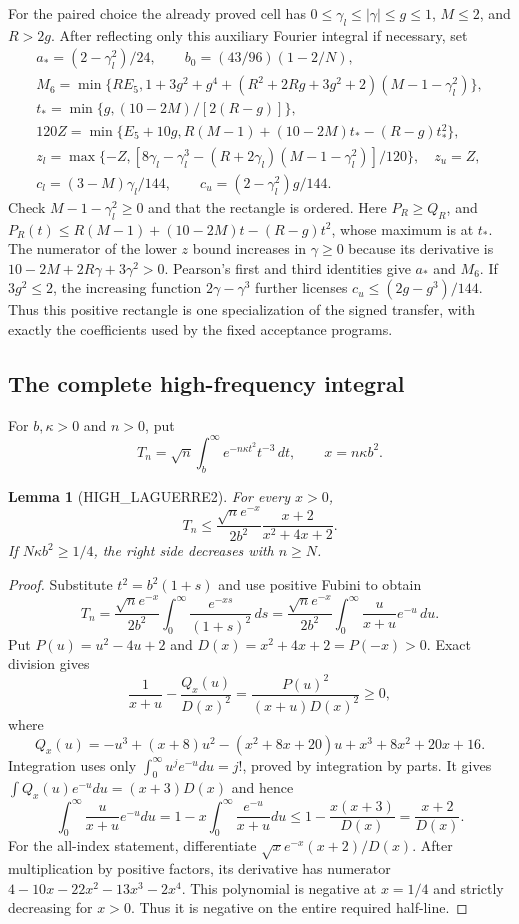 \documentclass[11pt,a4paper]{article}
\numberwithin{equation}{section}
\newtheorem{lemma}[theorem]{Lemma}
\theoremstyle{definition}
\theoremstyle{remark}
\begin{document}
For the paired choice the already proved cell has
$0\le\gamma_l\le|\gamma|\le g\le1$, $M\le2$, and $R>2g$. After reflecting only this auxiliary Fourier integral if necessary, set
\begin{gather*}
 a_*=(2-\gamma_l^2)/24,\qquad b_0=(43/96)(1-2/N),\\
 M_6=\min\{RE_5,1+3g^2+g^4+(R^2+2Rg+3g^2+2)(M-1-\gamma_l^2)\},\\
 t_*=\min\{g,(10-2M)/[2(R-g)]\},\\
 120Z=\min\{E_5+10g,R(M-1)+(10-2M)t_*-(R-g)t_*^2\},\\
 z_l=\max\{-Z,[8\gamma_l-\gamma_l^3-(R+2\gamma_l)(M-1-\gamma_l^2)]/120\},
 \quad z_u=Z,\\
 c_l=(3-M)\gamma_l/144,\qquad c_u=(2-\gamma_l^2)g/144.
\end{gather*}
Check $M-1-\gamma_l^2\ge0$ and that the rectangle is ordered. Here
$P_R\ge Q_R$, and $P_R(t)\le R(M-1)+(10-2M)t-(R-g)t^2$,
whose maximum is at $t_*$. The numerator of the lower $z$ bound increases
in $\gamma\ge0$ because its derivative is
$10-2M+2R\gamma+3\gamma^2>0$. Pearson's first and third identities
give $a_*$ and $M_6$. If $3g^2\le2$, the increasing function
$2\gamma-\gamma^3$ further licenses $c_u\le(2g-g^3)/144$.
Thus this positive rectangle is one specialization of the signed transfer,
with exactly the coefficients used by the fixed acceptance programs.

\subsection{The complete high-frequency integral}
For $b,\kappa>0$ and $n>0$, put
\[
 T_n=\sqrt n\int_b^\infty e^{-n\kappa t^2}t^{-3}\,dt,
 \qquad x=n\kappa b^2.
\]
\begin{lemma}[HIGH\_LAGUERRE2]
For every $x>0$,
\[
 T_n\le\frac{\sqrt n e^{-x}}{2b^2}
                  \frac{x+2}{x^2+4x+2}.
\]
If $N\kappa b^2\ge1/4$, the right side decreases with $n\ge N$.
\end{lemma}
\begin{proof}
Substitute $t^2=b^2(1+s)$ and use positive Fubini to obtain
\[
 T_n=\frac{\sqrt n e^{-x}}{2b^2}
 \int_0^\infty\frac{e^{-xs}}{(1+s)^2}\,ds
 =\frac{\sqrt n e^{-x}}{2b^2}
 \int_0^\infty\frac{u}{x+u}e^{-u}\,du.
\]
Put $P(u)=u^2-4u+2$ and $D(x)=x^2+4x+2=P(-x)>0$.
Exact division gives
\[
 \frac1{x+u}-\frac{Q_x(u)}{D(x)^2}
       =\frac{P(u)^2}{(x+u)D(x)^2}\ge0,
\]
where
\[
 Q_x(u)=-u^3+(x+8)u^2-(x^2+8x+20)u
                  +x^3+8x^2+20x+16.
\]
Integration uses only $\int_0^\infty u^j e^{-u}du=j!$, proved by
integration by parts. It gives
$\int Q_x(u)e^{-u}du=(x+3)D(x)$ and hence
\[
 \int_0^\infty\frac{u}{x+u}e^{-u}du
 =1-x\int_0^\infty\frac{e^{-u}}{x+u}du
 \le1-\frac{x(x+3)}{D(x)}=\frac{x+2}{D(x)}.
\]
For the all-index statement, differentiate
$\sqrt{x}e^{-x}(x+2)/D(x)$. After multiplication by positive factors,
its derivative has numerator
$4-10x-22x^2-13x^3-2x^4$. This polynomial is negative at $x=1/4$
and strictly decreasing for $x>0$. Thus it is negative on the entire
required half-line.
\end{proof}
\end{document}
